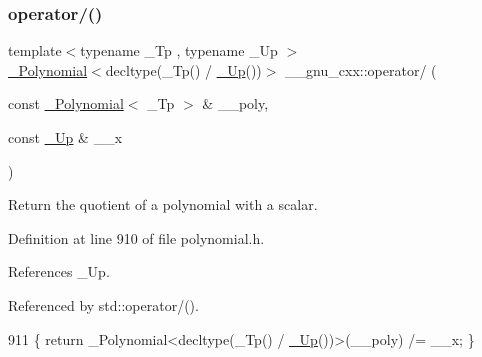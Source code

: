 \subsubsection{\texorpdfstring{operator/()}{operator/()}\hspace{0.1cm}{\footnotesize\ttfamily [3/5]}}
{\footnotesize\ttfamily template$<$typename \+\_\+\+Tp , typename \+\_\+\+Up $>$ \\
\hyperlink{class____gnu__cxx_1_1__Polynomial}{\+\_\+\+Polynomial}$<$decltype(\+\_\+\+Tp() / \hyperlink{namespace____gnu__cxx_ab693ea357b6429b331e0bf09f9442385}{\+\_\+\+Up}())$>$ \+\_\+\+\_\+gnu\+\_\+cxx\+::operator/ (\begin{DoxyParamCaption}\item[{const \hyperlink{class____gnu__cxx_1_1__Polynomial}{\+\_\+\+Polynomial}$<$ \+\_\+\+Tp $>$ \&}]{\+\_\+\+\_\+poly,  }\item[{const \hyperlink{namespace____gnu__cxx_ab693ea357b6429b331e0bf09f9442385}{\+\_\+\+Up} \&}]{\+\_\+\+\_\+x }\end{DoxyParamCaption})\hspace{0.3cm}{\ttfamily [inline]}}

Return the quotient of a polynomial with a scalar. 

Definition at line 910 of file polynomial.\+h.



References \+\_\+\+Up.



Referenced by std\+::operator/().


\begin{DoxyCode}
911     \{ \textcolor{keywordflow}{return} \_Polynomial<decltype(\_Tp() / \hyperlink{namespace____gnu__cxx_ab693ea357b6429b331e0bf09f9442385}{\_Up}())>(\_\_poly) /= \_\_x; \}
\end{DoxyCode}
\mbox{\label{namespace____gnu__cxx_a6ba146c479b383e9ba26760c847e3dc6}} 
